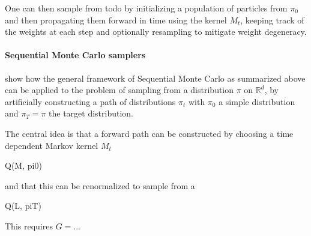 \documentclass{article}
\begin{document}
One can then sample from todo
by initializing a population of particles from $\pi_0$ and then propagating them forward in time using the kernel $M_t$, keeping track of the weights at each step and optionally resampling to mitigate weight degeneracy.







\paragraph{Sequential Monte Carlo samplers}

\cite{doucet2001sequential} show how the general framework of Sequential Monte Carlo as summarized above can be applied to the problem of sampling from a distribution $\pi$ on $\mathbb{R}^d$, by artificially constructing a path of distributions $\pi_t$ with $\pi_0$ a simple distribution and $\pi_T = \pi$ the target distribution.

The central idea is that a forward path can be constructed by choosing a time dependent Markov kernel $M_t$

Q(M, pi0)

and that this can be renormalized to sample from a 

Q(L, piT)

This requires $G = ...$








\end{document}
